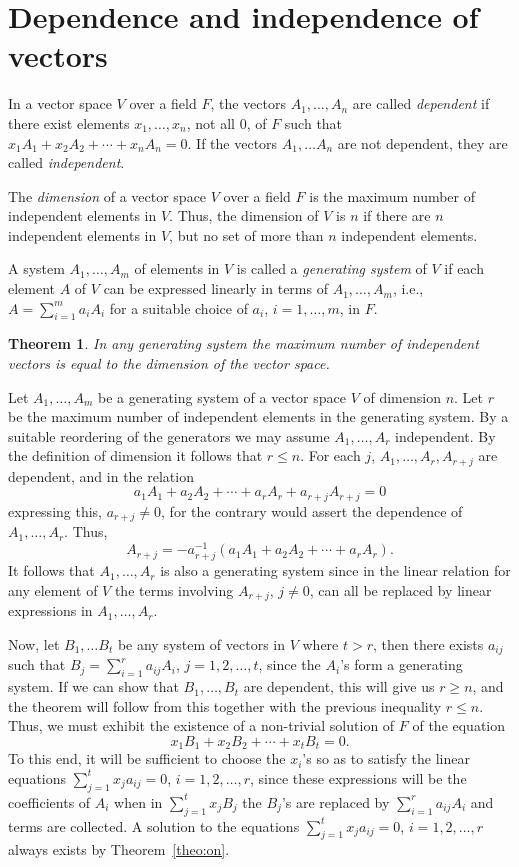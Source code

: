 \documentclass[10pt,leqno,a5paper]{book}
\newtheorem{theo}{Theorem}
\theoremstyle{definition}
\let\htw\section
\begin{document}
\htw[Dependence and independence]{Dependence and independence of vectors}

In a vector space $V$ over a field $F$, the vectors $A_1, \ldots, A_n$ are called \emph{dependent} if there exist elements $x_1, \ldots, x_n$, not all $0$, of $F$ such that $x_1 A_1 + x_2 A_2 + \cdots + x_n A_n = 0$.
If the vectors $A_1, \ldots A_n$ are not dependent, they are called \emph{independent}.

The \emph{dimension} of a vector space $V$ over a field $F$ is the maximum number of independent elements in $V$. Thus, the dimension of $V$ is $n$ if there are $n$ independent elements in $V$, but no set of more than $n$ independent elements.

A system $A_1, \ldots, A_m$ of elements in $V$ is called a \emph{generating system} of $V$ if each element $A$ of $V$ can be expressed linearly in terms of $A_1, \ldots, A_m$, i.e., $A = \sum_{i = 1}^m a_i A_i$ for a suitable choice of $a_i$, $i = 1,\ldots, m$, in $F$.


\begin{theo}
\label{theo:tw}
In any generating system the maximum number of independent vectors is equal to the dimension of the vector space.
\end{theo}

Let $A_1, \ldots, A_m$ be a generating system of a vector space $V$ of dimension $n$.
Let $r$ be the maximum number of independent elements in the generating system.
By a suitable reordering of the generators we may assume $A_1, \dots, A_r$ independent.
By the definition of dimension it follows that $r \leq n$.
For each $j$, $A_1, \ldots, A_r, A_{r+j}$ are dependent, and in the relation
\[
a_1 A_1 + a_2 A_2 + \cdots + a_r A_r + a_{r+j} A_{r+j} = 0
\]
expressing this, $a_{r+j} \not=0$, for the contrary would assert the dependence of $A_1, \ldots, A_r$.
Thus,
\[
A_{r+j} = -a_{r+j}^{-1}(a_1 A_1 + a_2 A_2 + \cdots + a_r A_r).
\]
It follows that $A_1, \ldots, A_r$ is also a generating system since in the linear relation for any element of $V$ the terms involving $A_{r+j}$, $j\not=0$, can all be replaced by linear expressions in $A_1, \ldots, A_r$.

Now, let $B_1, \ldots B_t$ be any system of vectors in $V$ where $t > r$, then there exists $a_{ij}$ such that $B_j = \sum_{i=1}^r a_{ij} A_i$, $j=1,2,\dots,t$, since the $A_i$'s form a generating system.
If we can show that $B_1, \ldots, B_t$ are dependent, this will give us $r \geq n$, and the theorem will follow from this together with the previous inequality $r \leq n$.
Thus, we must exhibit the existence of a non-trivial solution of $F$ of the equation
\[
x_1 B_1 + x_2 B_2 + \cdots + x_t B_t = 0.
\]
To this end, it will be sufficient to choose the $x_i$'s so as to satisfy the linear equations $\sum_{j=1}^t x_j a_{ij} = 0$, $i = 1,2,\dots,r$, since these expressions will be the coefficients of $A_i$ when in $\sum_{j=1}^t x_j B_j$ the $B_j$'s are replaced by $\sum_{i=1}^r a_{ij} A_i$ and terms are collected.
A solution to the equations $\sum_{j=1}^t x_j a_{ij} = 0$, $i = 1,2,\ldots,r$ always exists by Theorem~\ref{theo:on}.
\end{document}
